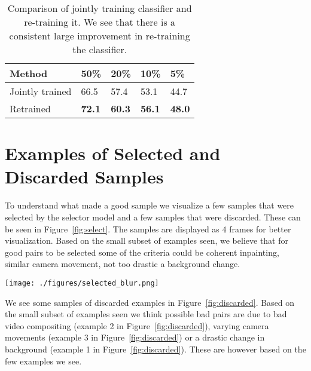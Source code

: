 \documentclass[runningheads]{llncs}
\begin{document}
\begin{table}[htb]
\begin{center}
\begin{tabular}{lllll}
Method        & 50\% & 20\% & 10\% & 5\%  \\
\hline
Jointly trained & 66.5 & 57.4 & 53.1 & 44.7 \\
Retrained  & \textbf{72.1} & \textbf{60.3} & \textbf{56.1} & \textbf{48.0} \\
\end{tabular}
\end{center}
\caption{Comparison of jointly training classifier and re-training it. We see that there is a consistent large improvement in re-training the classifier.}
\label{tab:retrain}
\end{table}




\section{Examples of Selected and Discarded Samples}
\label{examples}

To understand what made a good sample we visualize a few samples that were selected by the selector model and a few samples that were discarded. These can be seen in Figure~\ref{fig:select}. The samples are displayed as 4 frames for better visualization. Based on the small subset of examples seen, we believe that for good pairs to be selected some of the criteria could be coherent inpainting, similar camera movement, not too drastic a background change.

\begin{figure*}[]
    \centering
    \texttt{[image: ./figures/selected\_blur.png]}
\caption{Visualizing selected examples. From top to bottom as (foreground, background) pairs: (flic-flac, cartwheel), (smile, laugh), (playing violin, playing cello), (front crawl, swimming backstroke). The first two are examples from HMDB51 and the last two from UCF101.
    }
    \label{fig:select}
\end{figure*}

We see some samples of discarded examples in Figure~\ref{fig:discarded}. Based on the small subset of examples seen we think possible bad pairs are due to bad video compositing (example 2 in Figure~\ref{fig:discarded}), varying camera movements (example 3 in Figure~\ref{fig:discarded}) or a drastic change in background (example 1 in Figure~\ref{fig:discarded}). These are however based on the few examples we see.
\end{document}
